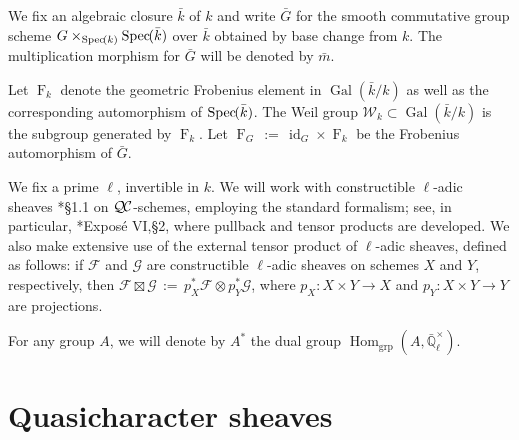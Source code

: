 \documentclass[11pt]{amsart}
\theoremstyle{plain}
\theoremstyle{definition}
\theoremstyle{remark}
\newcommand{\Spec}[1]{{\operatorname{Spec}\hskip-1pt( #1 )}}
\newcommand{\EE}{\mathbb{\bar Q}_\ell}
\newcommand{\bFq}{\bar{k}}
\newcommand{\Fq}{k}
\newcommand{\EEx}{\EE^\times}
\DeclareMathOperator{\Gal}{Gal}
\newcommand{\Frob}[1]{\operatorname{F}_{#1}}
\DeclareMathOperator{\Hom}{Hom}
\DeclareMathOperator{\id}{id}
\newcommand{\ceq}{{\, :=\, }}
\newcommand{\QC}{{\mathcal{Q\hskip-0.8pt C}}}
\newcommand{\Weil}[1]{\mathcal{W}_{#1}}
\newcommand{\bm}{\bar{m}}
\newcommand{\bG}{\bar{G}}
\begin{document}
We fix an algebraic closure $\bFq$ of $\Fq$ and write $\bG$ for the
smooth commutative group scheme $G \times_{\Spec{\Fq}} \Spec{\bFq}$ over $\bFq$
obtained by base change from $k$. The multiplication morphism for $\bG$ will be denoted by $\bm$. 

Let $\Frob{\Fq}$ denote the geometric Frobenius element in $\Gal(\bFq/\Fq)$ as
well as the corresponding automorphism of $\Spec{\bFq}$. The Weil group
$\Weil{\Fq}\subset \Gal(\bFq/\Fq)$ is the subgroup generated by $\Frob{\Fq}$.
Let $\Frob{G} \ceq \id_{G} \times \Frob{\Fq}$ be the Frobenius automorphism of $\bG$. 

We fix a prime $\ell$, invertible in $\Fq$.
We will work with constructible $\ell$-adic sheaves \cite{deligne:80a}*{\S 1.1} on $\QC$-schemes,
employing the standard formalism;
see, in particular, \cite{SGA5}*{Expos\'e VI,\S 2}, where pullback and tensor products are developed.
We also make extensive use of the external tensor product of $\ell$-adic sheaves, defined as follows: if $\mathcal{F}$ and $\mathcal{G}$ are constructible $\ell$-adic sheaves on schemes $X$ and $Y$, respectively, then $\mathcal{F}\boxtimes \mathcal{G} \ceq p_X^* \mathcal{F} \otimes p_Y^*\mathcal{G}$, where $p_X : X\times Y\to X$ and $p_Y : X\times Y \to Y$ are projections.

For any group $A$, we will denote by $A^*$ the dual group $\Hom_\text{grp}(A, \EEx)$.

\section{Quasicharacter sheaves}\label{sec:category}
\end{document}
